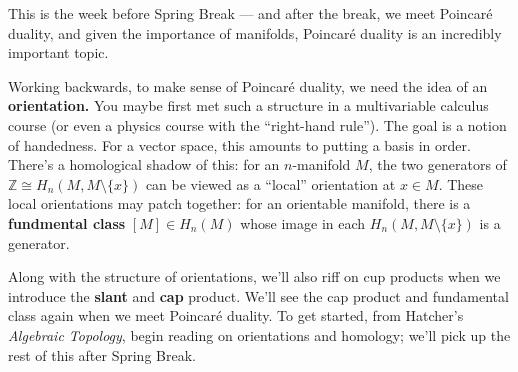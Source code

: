 \documentclass{homework}
\author{Jim Fowler}
\date{Week 9: Orientations}
\begin{document}
\maketitle

This is the week before Spring Break --- and after the break, we meet
Poincar\'e duality, and given the importance of manifolds, Poincar\'e
duality is an incredibly important topic.  

Working backwards, to make sense of Poincar\'e duality, we need the
idea of an \textbf{orientation.}  You maybe first met such a structure
in a multivariable calculus course (or even a physics course with the
``right-hand rule'').  The goal is a notion of handedness.  For a
vector space, this amounts to putting a basis in order.  There's a
homological shadow of this: for an $n$-manifold $M$, the two
generators of $\mathbb{Z} \cong H_n(M, M \setminus \{ x \})$ can be
viewed as a ``local'' orientation at $x \in M$.  These local
orientations may patch together: for an orientable manifold, there is
a \textbf{fundmental class} $[M] \in H_n(M)$ whose image in each
$H_n(M,M\setminus \{x\})$ is a generator.

Along with the structure of orientations, we'll also riff on cup
products when we introduce the \textbf{slant} and \textbf{cap}
product.  We'll see the cap product and fundamental class again when
we meet Poincar\'e duality. To get started, from Hatcher's
\textit{Algebraic Topology}, begin reading  on
orientations and homology; we'll pick up the rest of this after Spring
Break.
\end{document}
